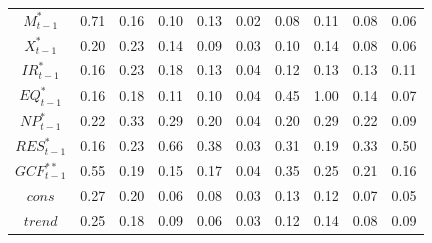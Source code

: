 \documentclass[a4paper, twoside]{templates/ociamthesis}
\begin{document}
\begin{table}[!ht]
\begin{tabular}[t]{cccccccccc}
$M^*_{t-1}$ & 0.71 & 0.16 & 0.10 & 0.13 & 0.02 & 0.08 & 0.11 & 0.08 & 0.06\\
$X^*_{t-1}$ & 0.20 & 0.23 & 0.14 & 0.09 & 0.03 & 0.10 & 0.14 & 0.08 & 0.06\\
$IR^*_{t-1}$ & 0.16 & 0.23 & 0.18 & 0.13 & 0.04 & 0.12 & 0.13 & 0.13 & 0.11\\
$EQ^*_{t-1}$ & 0.16 & 0.18 & 0.11 & 0.10 & 0.04 & 0.45 & 1.00 & 0.14 & 0.07\\
$NP^*_{t-1}$ & 0.22 & 0.33 & 0.29 & 0.20 & 0.04 & 0.20 & 0.29 & 0.22 & 0.09\\
$RES^*_{t-1}$ & 0.16 & 0.23 & 0.66 & 0.38 & 0.03 & 0.31 & 0.19 & 0.33 & 0.50\\
$GCF^{**}_{t-1}$ & 0.55 & 0.19 & 0.15 & 0.17 & 0.04 & 0.35 & 0.25 & 0.21 & 0.16\\
$cons$ & 0.27 & 0.20 & 0.06 & 0.08 & 0.03 & 0.13 & 0.12 & 0.07 & 0.05\\
$trend$ & 0.25 & 0.18 & 0.09 & 0.06 & 0.03 & 0.12 & 0.14 & 0.08 & 0.09\\
\bottomrule
\end{tabular}
\end{table}

\clearpage
\end{document}
